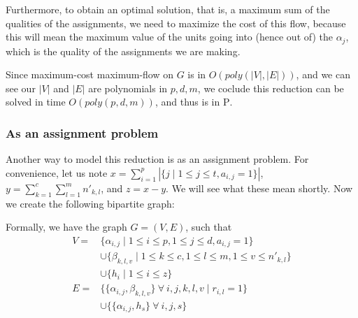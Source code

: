 Furthermore, to obtain an optimal solution, that is, a maximum sum of the qualities of the assignments, we need to maximize the cost of this flow, because this will mean the maximum value of the units going into (hence out of) the $\alpha_j$, which is the quality of the assignments we are making.

Since maximum-cost maximum-flow on $G$ is in $O(poly(|V|, |E|))$, and we can see our $|V|$ and $|E|$ are polynomials in $p, d, m$, we coclude this reduction can be solved in time $O(poly(p, d, m))$, and thus is in \textsc{P}.

\subsubsection{As an assignment problem}

Another way to model this reduction is as an assignment problem. For convenience, let us note $x = \sum_{i = 1}^p |\{j \mid 1 \le j \le t, a_{i, j} = 1\}|$, $y = \sum_{k = 1}^c \sum_{l = 1}^m n'_{k, l}$, and $z = x - y$. We will see what these mean shortly. Now we create the following bipartite graph:

\begin{center}
\end{center}

Formally, we have the graph $G = (V, E)$, such that
\begin{align*}
V = & \{\alpha_{i, j} \mid 1 \le i \le p, 1 \le j \le d, a_{i, j} = 1\}\\
    & \cup \{\beta_{k, l, v} \mid 1 \le k \le c, 1 \le l \le m, 1 \le v \le n'_{k, l}\}\\
    & \cup \{h_i \mid 1 \le i \le z\}\\
E = & \{\{\alpha_{i, j}, \beta_{k, l, v}\}\ \forall\ i, j, k, l, v \mid r_{i, l} = 1\}\\
    & \cup \{\{\alpha_{i, j}, h_s\}\ \forall\ i, j, s\}
\end{align*}

